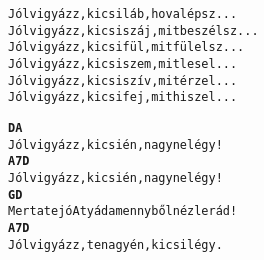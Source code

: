 \begin{minipage}{\textwidth}
\kottastart
{}
\kottaend
\begin{minipage}{\textwidth}
\begin{multicols}{2}
\begin{minipage}{\textwidth}
\begin{alltt}
Jól vigyázz, kicsi láb, hova lépsz...
Jól vigyázz, kicsi száj, mit beszélsz...
Jól vigyázz, kicsi fül, mit fülelsz...
Jól vigyázz, kicsi szem, mit lesel...
Jól vigyázz, kicsi szív, mit érzel...
Jól vigyázz, kicsi fej, mit hiszel...
\end{alltt}
\vspace{0.0cm}
\versszakspacing
\end{minipage}
\begin{minipage}{\textwidth}
\begin{alltt}
\textbf{        D                       A}
Jól vigyázz, kicsi én, nagy ne légy!
\textbf{        A7                      D}
Jól vigyázz, kicsi én, nagy ne légy!
\textbf{        G                  D}
Mert a te jó Atyád a mennyből néz le rád!
\textbf{        A7                      D}
Jól vigyázz, te nagy én, kicsi légy.
\end{alltt}
\vspace{0.0cm}
\versszakspacing
\end{minipage}
\vspace{0.2cm}
\end{multicols}
\end{minipage}

\end{minipage}
~\vspace{1.0cm}
\newline
